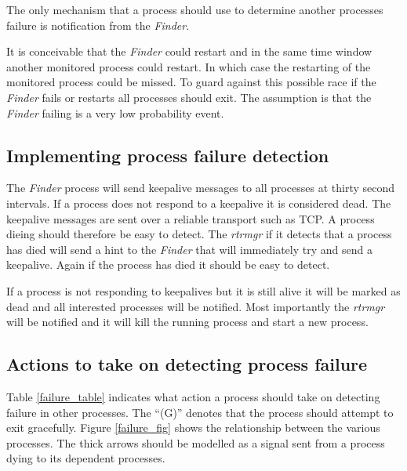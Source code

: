 \documentclass[11pt]{article}
\makeatletter
\newcommand{\finder} {{\em Finder}\@\xspace}
\newcommand{\rtrmgr} {{\em rtrmgr}\@\xspace}
\makeatother
\begin{document}
The only mechanism that a process should use to determine another
processes failure is notification from the \finder.

It is conceivable that the \finder could restart and in the same time
window another monitored process could restart. In which case the
restarting of the monitored process could be missed. To guard against
this possible race if the \finder fails or restarts all processes
should exit. The assumption is that the \finder failing is a very low
probability event.

\subsection{Implementing process failure detection}

The \finder process will send keepalive messages to all processes at
thirty second intervals. If a process does not respond to a keepalive
it is considered dead. The keepalive messages are sent over a reliable
transport such as TCP. A process dieing should therefore be easy to
detect. The \rtrmgr if it detects that a process has died will send a
hint to the \finder that will immediately try and send a keepalive.
Again if the process has died it should be easy to detect.

If a process is not responding to keepalives but it is still alive it
will be marked as dead and all interested processes will be notified.
Most importantly the \rtrmgr will be notified and it will kill the
running process and start a new process.

\subsection{Actions to take on detecting process failure}

Table \ref{failure_table} indicates what action a process should take
on detecting failure in other processes. The ``(G)'' denotes that the
process should attempt to exit gracefully. Figure \ref{failure_fig}
shows the relationship between the various processes. The thick arrows
should be modelled as a signal sent from a process dying to its
dependent processes.
\end{document}
